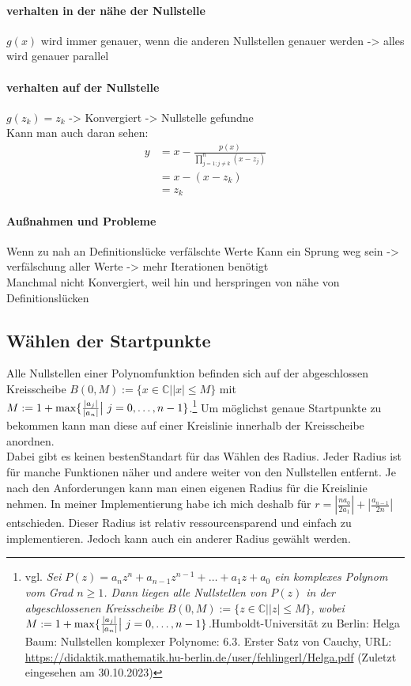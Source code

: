 \documentclass[12pt]{article}
\begin{document}
\paragraph{verhalten in der nähe der Nullstelle}
$g(x)$ wird immer genauer, wenn die anderen Nullstellen genauer werden
-> alles wird genauer parallel
\paragraph{verhalten auf der Nullstelle}
$g(z_k) = z_k$ -> Konvergiert -> Nullstelle gefundne
\\
Kann man auch daran sehen:
\begin{align*}
    y &= x - \frac{p(x)}{\prod_{j=1;j\neq k}^{n} (x-z_j)} \\
    &= x - (x-z_k) \\
    &= z_k
\end{align*}
\paragraph{Außnahmen und Probleme}
Wenn zu nah an Definitionslücke verfälschte Werte
Kann ein Sprung weg sein -> verfälschung aller Werte -> mehr Iterationen benötigt
\\
Manchmal nicht Konvergiert, weil hin und herspringen von nähe von Definitionslücken

\subsection{Wählen der Startpunkte}
Alle Nullstellen einer Polynomfunktion befinden sich auf der abgeschlossen Kreisscheibe  $B(0,M) := \{x \in \mathbb{C} \bigr| |x| \le M\}$ mit $M := 1 + \max\{\frac{|a_j|}{|a_n|}\bigr|\text{\space}j=0,\dots,n-1\}$.\footnote{vgl. \glqq\textit{Sei $P(z) = a_nz^n+a_{n-1}z^{n-1}+\dots+a_1z+a_0$ ein komplexes Polynom vom Grad $n \ge 1$. Dann liegen alle Nullstellen von $P(z)$ in der abgeschlossenen Kreisscheibe $B(0,M) := \{z \in \mathbb{C} \bigr| |z| \le M\}$, wobei $M := 1 + \max\{\frac{|a_j|}{|a_n|}\bigr|\text{\space}j=0,\dots,n-1\}$.}\grqq\space Humboldt-Universität zu Berlin: Helga Baum: Nullstellen komplexer Polynome: 6.3. Erster Satz von Cauchy, URL: \url{https://didaktik.mathematik.hu-berlin.de/user/fehlingerl/Helga.pdf} (Zuletzt eingesehen am 30.10.2023)}  Um möglichst genaue Startpunkte zu bekommen kann man diese auf einer Kreislinie innerhalb der Kreisscheibe anordnen. \\
Dabei gibt es keinen \glqq besten\grqq\space Standart für das Wählen des Radius. Jeder Radius ist für manche Funktionen näher und andere weiter von den Nullstellen entfernt. Je nach den Anforderungen kann man einen eigenen Radius für die Kreislinie nehmen. In meiner Implementierung habe ich mich deshalb für $r = |\frac{na_0}{2a_1}| + |\frac{a_{n-1}}{2n}|$ entschieden.
Dieser Radius ist relativ ressourcensparend und einfach zu implementieren. Jedoch kann auch ein anderer Radius gewählt werden.
\end{document}
